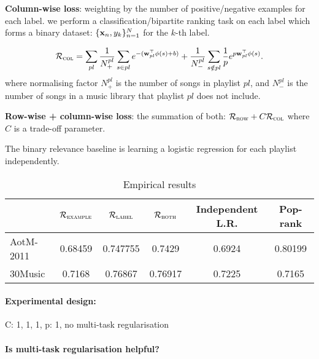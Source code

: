 {\bf Column-wise loss}: weighting by the number of positive/negative examples for each label.
\ie we perform a classification/bipartite ranking task on each label which forms a binary dataset:
$\{\mathbf{x}_n, y_k\}_{n=1}^N$ for the $k$-th label.

\begin{equation*}
\mathcal{R}_\textsc{col} 
= \displaystyle \sum_{pl}
  \frac{1}{N_+^{pl}} \sum_{s \in pl} e^{-(\mathbf{w}_{pl}^\top \phi(s) + b)} +
  \frac{1}{N_-^{pl}} \sum_{s \notin pl} \frac{1}{p} e^{p \mathbf{w}_{pl}^\top \phi(s)}.
\end{equation*}
where normalising factor $N_+^{pl}$ is the number of songs in playlist $pl$,
and $N_-^{pl}$ is the number of songs in a music library that playlist $pl$ does not include.


{\bf Row-wise + column-wise loss}: the summation of both: $\mathcal{R}_\textsc{row} + C \mathcal{R}_\textsc{col}$ 
where $C$ is a trade-off parameter.

The binary relevance baseline is learning a logistic regression for each playlist independently.


\begin{table}[!h]
\centering
\caption{Empirical results}
\begin{tabular}{l|ccccc}
\toprule
{}            & $\mathcal{R}_\textsc{example}$ & $\mathcal{R}_\textsc{label}$ & $\mathcal{R}_\textsc{both}$ & Independent L.R. & Pop-rank \\
\midrule
AotM-2011     & 0.68459 & 0.747755 & 0.7429  & 0.6924 & 0.80199 \\
30Music       & 0.7168  & 0.76867  & 0.76917 & 0.7225 & 0.7165 \\
\bottomrule
\end{tabular}
\end{table}

\paragraph{Experimental design:}
C: 1, 1, 1, p: 1, no multi-task regularisation

\paragraph{Is multi-task regularisation helpful?}

